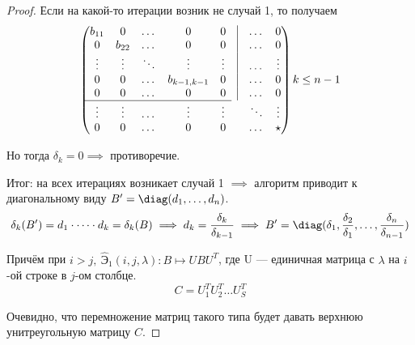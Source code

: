 \documentclass[a4paper]{article}
\begin{document}
\begin{colloq}
\begin{proof}
                Если на какой-то итерации возник не случай 1, то получаем 
                \begin{equation*}
                    \begin{pmatrix}
                        b_{11} & 0       & \dots  & 0       & 0       & \vline & \dots & 0 \\
                        0       & b_{22} & \dots  & 0       & 0       & \vline & \dots & 0 \\
                        \vdots  & \vdots  & \ddots & \vdots  & \vdots  & \vline & \dots & \vdots \\
                        0       & 0       & \dots  & b_{k-1, k-1} & 0   & \vline & \dots & 0 \\
                        0       & 0       & \dots  & 0       & 0       & \vline & \dots & 0 \\
                        \cline{1-5}
                        \vdots  & \vdots  & \dots  & \vdots  & \vdots  &        & \ddots & \vdots \\
                        0       & 0       & \dots  & 0       & 0       &        & \dots & \star
                        \end{pmatrix}
                        k \leq n-1
                    \end{equation*}

                Но тогда $\delta_{k} = 0 \implies$ противоречие.

                Итог: на всех итерациях возникает случай 1 $\implies$ алгоритм приводит к диагональному виду $B' = \diag(d_{1}, \dots, d_{n})$.
                \begin{equation*}
                    \delta_{k}(B') = d_{1} \cdot \dots \cdot d_{k} = \delta_{k}(B) \implies d_{k} = \frac{\delta_{k}}{\delta_{k - 1}} \implies B' = \diag(\delta_{1}, \frac{\delta_{2}}{\delta_{1}}, \dots, \frac{\delta_{n}}{\delta_{n - 1}})
                \end{equation*}

                Причём при $i > j, \ \widehat{\text{Э}}_{1} (i, j, \lambda) \colon B \mapsto U B U^{T}$, где U --- единичная матрица с $\lambda$ на $i$-ой строке в $j$-ом столбце.
                \begin{equation*}
                    C = U_{1}^{T} U_{2}^{T} \dots U_{S}^{T}
                \end{equation*}

                Очевидно, что перемножение матриц такого типа будет давать верхнюю унитреугольную матрицу $C$.
            \end{proof}


\end{colloq}
\end{document}
